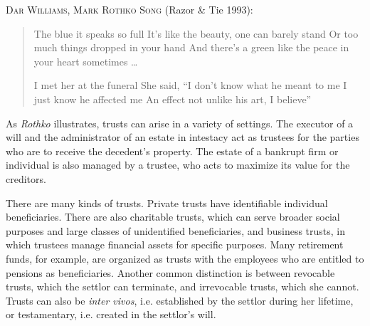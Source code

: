 

\item \textsc{Dar Williams, Mark Rothko Song} (Razor \& Tie
1993):
\begin{verse}
The blue it speaks so full\newline
It's like the beauty, one can barely stand\newline
Or too much things dropped in your hand\newline
And there's a green like the peace in your heart sometimes \ldots

I met her at the funeral\newline
She said, ``I don't know what he meant to me\newline
I just know he affected me\newline
An effect not unlike his art, I believe''
\end{verse}

\item As \textit{Rothko} illustrates, trusts can arise in a variety of settings.
The executor of a will and the administrator of an estate in intestacy act as
trustees for the parties who are to receive the decedent's property. The estate
of a bankrupt firm or individual is also managed by a trustee, who acts to
maximize its value for the creditors.


There are many kinds of trusts. Private trusts have identifiable individual
beneficiaries. There are also charitable trusts, which can serve broader social
purposes and large classes of unidentified beneficiaries, and business trusts,
in which trustees manage financial assets for specific purposes. Many retirement
funds, for example, are organized as trusts with the employees who are entitled
to pensions as beneficiaries. Another common distinction is between revocable
trusts, which the settlor can terminate, and irrevocable trusts, which she
cannot. Trusts can also be \textit{inter vivos}, i.e. established by the settlor
during her lifetime, or testamentary, i.e. created in the settlor's will.



